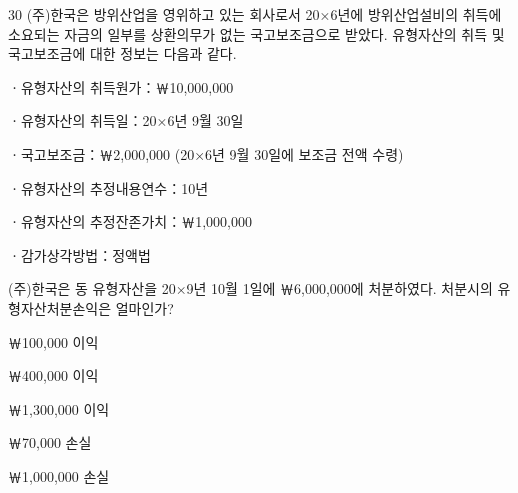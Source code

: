 \begin{question}{30}
(주)한국은 방위산업을 영위하고 있는 회사로서 20×6년에 방위산업설비의 취득에 소요되는 자금의 일부를 상환의무가 없는 국고보조금으로 받았다. 유형자산의 취득 및 국고보조금에 대한 정보는 다음과 같다.
\begin{framedtext}
ㆍ유형자산의 취득원가：￦10,000,000 \par
ㆍ유형자산의 취득일：20×6년 9월 30일 \par
ㆍ국고보조금：￦2,000,000 (20×6년 9월 30일에 보조금 전액 수령) \par
ㆍ유형자산의 추정내용연수：10년 \par
ㆍ유형자산의 추정잔존가치：￦1,000,000 \par
ㆍ감가상각방법：정액법 \par
\end{framedtext}
(주)한국은 동 유형자산을 20×9년 10월 1일에 ￦6,000,000에 처분하였다. 처분시의 유형자산처분손익은 얼마인가? \par
\begin{choices}
  \item ￦100,000 이익
  \item ￦400,000 이익
  \item ￦1,300,000 이익
  \item ￦70,000 손실
  \item ￦1,000,000 손실
\end{choices}
\end{question}
